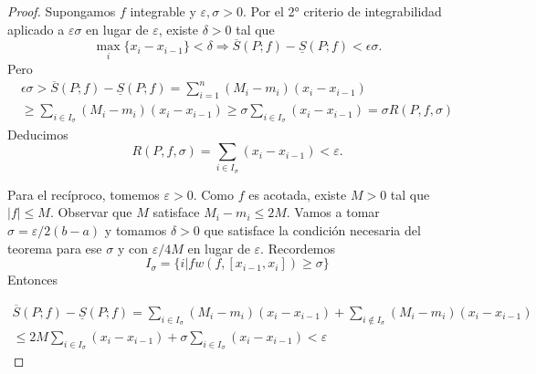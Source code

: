 \begin{proof} Supongamos $f$ integrable y $\varepsilon,\sigma>0$. Por el 2° criterio de integrabilidad aplicado a $ \varepsilon\sigma$ en lugar de $\varepsilon$, existe $\delta>0$ tal que 
\[\max_i\{x_i-x_{i-1}\}<\delta\Rightarrow 
 \overline{S}(P;f)-\underline{S}(P;f)<\epsilon\sigma.
\]
Pero 
\begin{multline*}\label{eq:3crite}
\epsilon\sigma> \overline{S}(P;f)-\underline{S}(P;f)= \sum_{i=1}^n (M_i-m_i)(x_i-x_{i-1})\\
\geq \sum_{i\in I_\sigma} (M_i-m_i)(x_i-x_{i-1})\geq \sigma \sum_{i\in I_\sigma} (x_i-x_{i-1})=\sigma R(P,f,\sigma)
\end{multline*}
Deducimos
\[
 R(P,f,\sigma)=\sum_{i\in I_{\sigma}}(x_i-x_{i-1})<\varepsilon.
\]

Para el recíproco, tomemos $\varepsilon>0$. Como $f$ es acotada, existe $M>0$ tal que $|f|\leq M$.  Observar que  $M$ satisface $M_i-m_i\leq 2M$. Vamos a tomar $\sigma=\varepsilon/2(b-a)$ y tomamos $\delta>0$ que satisface la condición necesaria del teorema para ese $\sigma$ y con $\varepsilon/4M$ en lugar de $\varepsilon$. Recordemos
\[
 I_\sigma=\{i \left|{f}\right. w(f,[x_{i-1},x_i])\geq \sigma\}
\]
Entonces 

\begin{multline*}\label{eq:3criteb}
 \overline{S}(P;f)-\underline{S}(P;f)= \sum_{i\in I_\sigma} (M_i-m_i)(x_i-x_{i-1})+\sum_{i\notin I_\sigma} (M_i-m_i)(x_i-x_{i-1})\\
 \leq 2M\sum_{i\in I_\sigma}  (x_i-x_{i-1})+ \sigma \sum_{i\in I_\sigma}  (x_i-x_{i-1})<\varepsilon
\end{multline*}

 
\end{proof}




